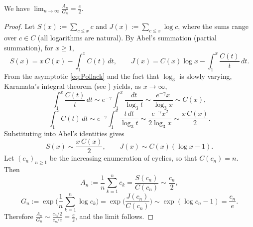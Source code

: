 \begin{theorem}\label{thm:hassani}
We have $\displaystyle \lim_{n\to\infty}\frac{A_n}{G_n}=\frac{e}{2}$.
\end{theorem}

\begin{proof}
Let $S(x):=\sum_{c\le x} c$ and $J(x):=\sum_{c\le x} \log c$, where the sums range over $c\in C$ (all logarithms are natural). By Abel's summation (partial summation), for $x\ge1$,
\[
 S(x)=x\,C(x)-\int_1^x C(t)\,dt,\qquad J(x)=C(x)\log x-\int_1^x \frac{C(t)}{t}\,dt.
\]
From the asymptotic \eqref{eq:Pollack} and the fact that $\log_3$ is slowly varying, Karamata's integral theorem (see \cite[\S1.6]{BGT1989}) yields, as $x\to\infty$,
\[
 \int_1^x \frac{C(t)}{t}\,dt\sim e^{-\gamma}\int_1^x \frac{dt}{\log_3 t}\sim \frac{e^{-\gamma}x}{\log_3 x}\sim C(x),
\]
\[
 \int_1^x C(t)\,dt\sim e^{-\gamma}\int_1^x \frac{t\,dt}{\log_3 t}\sim \frac{e^{-\gamma}x^2}{2\log_3 x}\sim \frac{x\,C(x)}{2}.
\]
Substituting into Abel's identities gives
\[
 S(x)\sim \frac{x\,C(x)}{2},\qquad J(x)\sim C(x)(\log x-1).
\]
Let $(c_n)_{n\ge1}$ be the increasing enumeration of cyclics, so that $C(c_n)=n$. Then
\[
 A_n:=\frac{1}{n}\sum_{k=1}^n c_k=\frac{S(c_n)}{C(c_n)}\sim \frac{c_n}{2},
\]
\[
 G_n:=\exp\!\Big(\frac{1}{n}\sum_{k=1}^n \log c_k\Big)=\exp\!\Big(\frac{J(c_n)}{C(c_n)}\Big)\sim \exp(\log c_n-1)=\frac{c_n}{e}.
\]
Therefore $\displaystyle \frac{A_n}{G_n}\sim \frac{c_n/2}{c_n/e}=\frac{e}{2}$, and the limit follows.
\end{proof}
